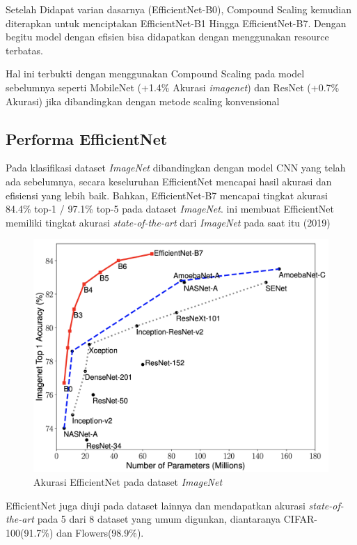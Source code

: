 Setelah Didapat varian dasarnya (EfficientNet-B0), Compound Scaling kemudian diterapkan untuk menciptakan EfficientNet-B1 Hingga EfficientNet-B7. Dengan begitu model dengan efisien bisa didapatkan dengan menggunakan resource terbatas.

Hal ini terbukti dengan menggunakan Compound Scaling pada model sebelumnya seperti MobileNet (+1.4\% Akurasi \textit{imagenet}) dan ResNet (+0.7\% Akurasi) jika dibandingkan dengan metode scaling konvensional \cite{cit:effnet}

\vspace{2ex}
\subsection{Performa EfficientNet}
\label{subsec:efn-perf}

Pada klasifikasi dataset \textit{ImageNet} dibandingkan dengan model CNN yang telah ada sebelumnya, secara keseluruhan EfficientNet mencapai hasil akurasi dan efisiensi yang lebih baik. Bahkan, EfficientNet-B7 mencapai tingkat akurasi 84.4\% top-1 / 97.1\% top-5 pada dataset \textit{ImageNet}. ini membuat EfficientNet memiliki tingkat akurasi \textit{state-of-the-art} dari \textit{ImageNet} pada saat itu (2019)

\begin{figure}[h]
	\centering
	
	\includegraphics[width=0.9\columnwidth]{gambar/akurasiefn.png}
	
	\caption{Akurasi EfficientNet pada dataset \textit{ImageNet} \citep{cit:effnet}}
	\label{fig:akurasi-efn}
\end{figure}

EfficientNet juga diuji pada dataset lainnya dan mendapatkan akurasi \textit{state-of-the-art} pada 5 dari 8 dataset yang umum digunkan, diantaranya CIFAR-100(91.7\%) dan Flowers(98.9\%).